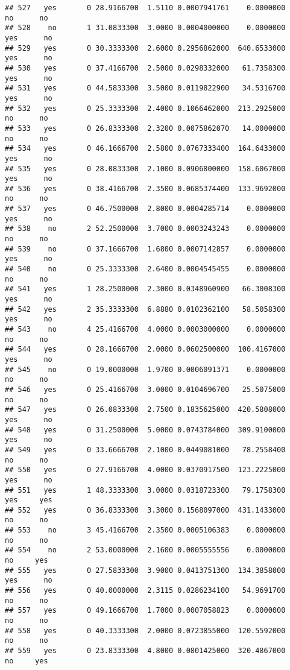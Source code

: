 \documentclass[]{article}
\begin{document}
\begin{verbatim}
## 527   yes       0 28.9166700  1.5110 0.0007941761    0.0000000    no      no
## 528    no       1 31.0833300  3.0000 0.0004000000    0.0000000   yes      no
## 529   yes       0 30.3333300  2.6000 0.2956862000  640.6533000   yes      no
## 530   yes       0 37.4166700  2.5000 0.0298332000   61.7358300   yes      no
## 531   yes       0 44.5833300  3.5000 0.0119822900   34.5316700   yes      no
## 532   yes       0 25.3333300  2.4000 0.1066462000  213.2925000    no      no
## 533   yes       0 26.8333300  2.3200 0.0075862070   14.0000000    no      no
## 534   yes       0 46.1666700  2.5800 0.0767333400  164.6433000   yes      no
## 535   yes       0 28.0833300  2.1000 0.0906800000  158.6067000   yes      no
## 536   yes       0 38.4166700  2.3500 0.0685374400  133.9692000    no      no
## 537   yes       0 46.7500000  2.8000 0.0004285714    0.0000000   yes      no
## 538    no       2 52.2500000  3.7000 0.0003243243    0.0000000    no      no
## 539    no       0 37.1666700  1.6800 0.0007142857    0.0000000   yes      no
## 540    no       0 25.3333300  2.6400 0.0004545455    0.0000000    no      no
## 541   yes       1 28.2500000  2.3000 0.0348960900   66.3008300   yes      no
## 542   yes       2 35.3333300  6.8880 0.0102362100   58.5058300   yes      no
## 543    no       4 25.4166700  4.0000 0.0003000000    0.0000000    no      no
## 544   yes       0 28.1666700  2.0000 0.0602500000  100.4167000   yes      no
## 545    no       0 19.0000000  1.9700 0.0006091371    0.0000000    no      no
## 546   yes       0 25.4166700  3.0000 0.0104696700   25.5075000    no      no
## 547   yes       0 26.0833300  2.7500 0.1835625000  420.5808000   yes      no
## 548   yes       0 31.2500000  5.0000 0.0743784000  309.9100000   yes      no
## 549   yes       0 33.6666700  2.1000 0.0449081000   78.2558400    no      no
## 550   yes       0 27.9166700  4.0000 0.0370917500  123.2225000   yes      no
## 551   yes       1 48.3333300  3.0000 0.0318723300   79.1758300   yes     yes
## 552   yes       0 36.8333300  3.3000 0.1568097000  431.1433000    no      no
## 553    no       3 45.4166700  2.3500 0.0005106383    0.0000000    no      no
## 554    no       2 53.0000000  2.1600 0.0005555556    0.0000000    no     yes
## 555   yes       0 27.5833300  3.9000 0.0413751300  134.3858000   yes      no
## 556   yes       0 40.0000000  2.3115 0.0286234100   54.9691700    no      no
## 557   yes       0 49.1666700  1.7000 0.0007058823    0.0000000    no      no
## 558   yes       0 40.3333300  2.0000 0.0723855000  120.5592000    no      no
## 559   yes       0 23.8333300  4.8000 0.0801425000  320.4867000    no     yes

\end{verbatim}
\end{document}
